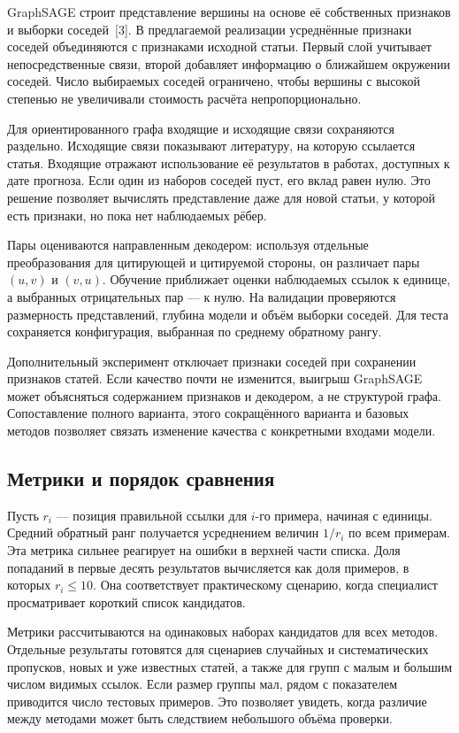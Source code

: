\documentclass[a4paper,14pt,oneside]{extarticle}
\begin{document}
GraphSAGE строит представление вершины на основе её собственных признаков и выборки соседей~[3].
В предлагаемой реализации усреднённые признаки соседей объединяются с признаками исходной
статьи. Первый слой учитывает непосредственные связи, второй добавляет информацию о ближайшем
окружении соседей. Число выбираемых соседей ограничено, чтобы вершины с высокой степенью
не увеличивали стоимость расчёта непропорционально.

Для ориентированного графа входящие и исходящие связи сохраняются раздельно. Исходящие связи
показывают литературу, на которую ссылается статья. Входящие отражают использование её результатов
в работах, доступных к дате прогноза. Если один из наборов соседей пуст, его вклад равен нулю.
Это решение позволяет вычислять представление даже для новой статьи, у которой есть признаки,
но пока нет наблюдаемых рёбер.

Пары оцениваются направленным декодером: используя отдельные преобразования для цитирующей
и цитируемой стороны, он различает пары \((u,v)\) и \((v,u)\). Обучение приближает оценки
наблюдаемых ссылок к единице, а выбранных отрицательных пар — к нулю. На валидации проверяются
размерность представлений, глубина модели и объём выборки соседей. Для теста сохраняется
конфигурация, выбранная по среднему обратному рангу.

Дополнительный эксперимент отключает признаки соседей при сохранении признаков статей.
Если качество почти не изменится, выигрыш GraphSAGE может объясняться содержанием признаков
и декодером, а не структурой графа. Сопоставление полного варианта, этого сокращённого
варианта и базовых методов позволяет связать изменение качества с конкретными входами модели.

\clearpage
\subsection{Метрики и порядок сравнения}

Пусть \(r_i\) — позиция правильной ссылки для \(i\)-го примера, начиная с единицы.
Средний обратный ранг получается усреднением величин \(1/r_i\) по всем примерам.
Эта метрика сильнее реагирует на ошибки в верхней части списка. Доля попаданий в первые
десять результатов вычисляется как доля примеров, в которых \(r_i \leq 10\).
Она соответствует практическому сценарию, когда специалист просматривает короткий список
кандидатов.

Метрики рассчитываются на одинаковых наборах кандидатов для всех методов. Отдельные результаты
готовятся для сценариев случайных и систематических пропусков, новых и уже известных статей,
а также для групп с малым и большим числом видимых ссылок. Если размер группы мал, рядом
с показателем приводится число тестовых примеров. Это позволяет увидеть, когда различие
между методами может быть следствием небольшого объёма проверки.
\end{document}
